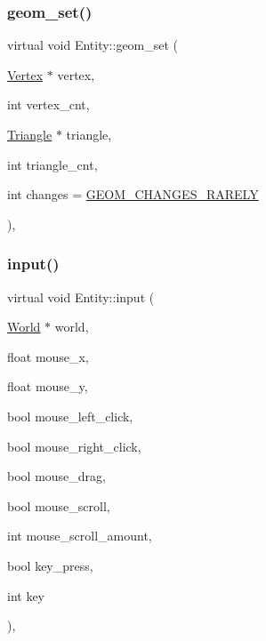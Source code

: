 \mbox{\label{classEntity_a9b71cfc90dee1d29b410649b43671fd5}} 
\subsubsection{\texorpdfstring{geom\+\_\+set()}{geom\_set()}}
{\footnotesize\ttfamily virtual void Entity\+::geom\+\_\+set (\begin{DoxyParamCaption}\item[{\mbox{\hyperlink{classVertex}{Vertex}} $\ast$}]{vertex,  }\item[{int}]{vertex\+\_\+cnt,  }\item[{\mbox{\hyperlink{classTriangle}{Triangle}} $\ast$}]{triangle,  }\item[{int}]{triangle\+\_\+cnt,  }\item[{int}]{changes = {\ttfamily \mbox{\hyperlink{World_8h_adf764cbdea00d65edcd07bb9953ad2b7afd62cb9ff74dd66a2597e9c31e205cba}{G\+E\+O\+M\+\_\+\+C\+H\+A\+N\+G\+E\+S\+\_\+\+R\+A\+R\+E\+LY}}} }\end{DoxyParamCaption})\hspace{0.3cm}{\ttfamily [protected]}, {\ttfamily [virtual]}}

\mbox{\label{classEntity_a3a63eb809c17ebe620fa330cc59760df}} 
\subsubsection{\texorpdfstring{input()}{input()}}
{\footnotesize\ttfamily virtual void Entity\+::input (\begin{DoxyParamCaption}\item[{\mbox{\hyperlink{classWorld}{World}} $\ast$}]{world,  }\item[{float}]{mouse\+\_\+x,  }\item[{float}]{mouse\+\_\+y,  }\item[{bool}]{mouse\+\_\+left\+\_\+click,  }\item[{bool}]{mouse\+\_\+right\+\_\+click,  }\item[{bool}]{mouse\+\_\+drag,  }\item[{bool}]{mouse\+\_\+scroll,  }\item[{int}]{mouse\+\_\+scroll\+\_\+amount,  }\item[{bool}]{key\+\_\+press,  }\item[{int}]{key }\end{DoxyParamCaption})\hspace{0.3cm}{\ttfamily [protected]}, {\ttfamily [virtual]}}

